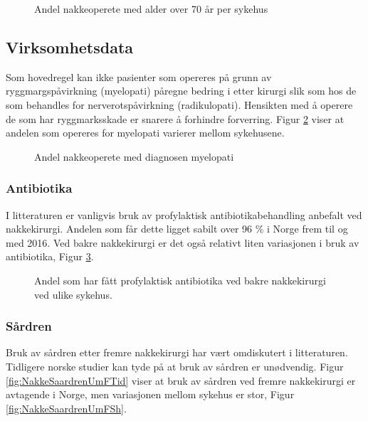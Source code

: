\documentclass [norsk,a4paper,twoside]{article}\usepackage[]{graphicx}\usepackage[]{color}
\begin{document}
\begin{figure}[ht]
\caption{\label{fig:NakkeAlder70Sh} Andel nakkeoperete med alder over 70 år per sykehus}
\end{figure}

\subsection{Virksomhetsdata}

Som hovedregel kan ikke pasienter som opereres på grunn av ryggmargspåvirkning (myelopati) påregne bedring i etter kirurgi slik som hos de som behandles for nerverotspåvirkning (radikulopati). Hensikten med å operere de som har ryggmarksskade er snarere å forhindre forverring. Figur \ref{fig:NakkeOprIndikMyelopatiSh} viser at andelen som opereres for myelopati varierer mellom sykehusene.

\begin{figure}[ht]
\caption{\label{fig:NakkeOprIndikMyelopatiSh} Andel nakkeoperete med diagnosen myelopati}
\end{figure}

\subsubsection{Antibiotika}

I litteraturen er vanligvis bruk av profylaktisk antibiotikabehandling  anbefalt ved nakkekirurgi. Andelen som får dette ligget sabilt over 96 \% i Norge frem til og med 2016. Ved bakre nakkekirurgi er det også relativt liten variasjonen i bruk av antibiotika, Figur \ref{fig:NakkeAntibiotikaBakSh}. 

\begin{figure}[ht]
\caption{\label{fig:NakkeAntibiotikaBakSh} Andel som har fått profylaktisk antibiotika ved bakre nakkekirurgi ved ulike sykehus. }
\end{figure}

\subsubsection{Sårdren}

Bruk av sårdren etter fremre nakkekirurgi har vært omdiskutert i litteraturen. Tidligere norske studier kan tyde på at bruk av sårdren er unødvendig. Figur \ref{fig:NakkeSaardrenUmFTid} viser at bruk av sårdren ved fremre nakkekirurgi er avtagende i Norge, men variasjonen mellom sykehus er stor, Figur \ref{fig:NakkeSaardrenUmFSh}.
\end{document}
